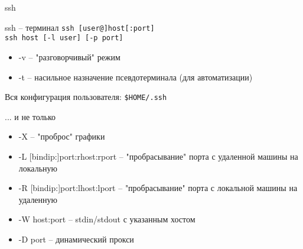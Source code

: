 \begin{frame}{ssh}

	\begin{block}{ssh -- терминал}
		{\tt ssh [user@]host[:port]}\\
		{\tt ssh host [-l user] [-p port]}
		\begin{itemize}
			\item -v -- "разговорчивый" режим 
			\item -t -- насильное назначение псевдотерминала (для автоматизации)
		\end{itemize}
		Вся конфигурация пользователя: {\tt \$HOME/.ssh}
	\end{block}

	\pause

	\begin{block}{... и не только}
		\begin{itemize}
			\item -X -- "проброс" графики 
			\item -L [bindip:]port:rhost:rport -- "пробрасывание" порта с удаленной машины на локальную
			\item -R [bindip:]port:lhost:lport -- "пробрасывание" порта с локальной машины на удаленную
			\item -W host:port -- stdin/stdout с указанным хостом
			\item -D port -- динамический прокси
		\end{itemize}
	\end{block}
\end{frame}


